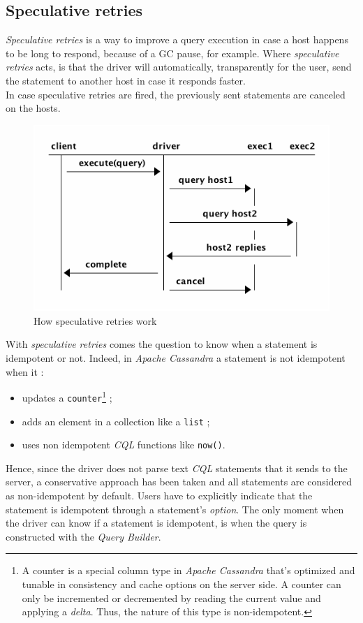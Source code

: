 \documentclass[a4paper]{report}
\newcommand{\ca}{\emph{Apache Cassandra\xspace}}
\newcommand{\sr}{\emph{speculative retries\xspace}}
\begin{document}
\subsection{Speculative retries}
\emph{Speculative retries} is a way to improve a query execution in case a host happens to be long to respond, because of a GC pause, for example. Where \sr{} acts, is that the driver will automatically, transparently for the user, send the statement to another host in case it responds faster.\\
In case speculative retries are fired, the previously sent statements are canceled on the hosts.\\
\begin{figure}[ht!]
\centering
\includegraphics[scale=0.7]{spec_rec.png}
\caption{How speculative retries work}
\end{figure}
With \sr{} comes the question to know when a statement is idempotent or not. Indeed, in \ca{} a statement is not idempotent when it : 
\begin{itemize}
   \item updates a \verb;counter;\footnote{A counter is a special column type in \ca{} that's optimized and tunable in consistency and cache options on the server side. A counter can only be incremented or decremented by reading the current value and applying a \emph{delta}. Thus, the nature of this type is non-idempotent.} ;
   \item adds an element in a collection like a \verb;list; ;
   \item uses non idempotent \emph{CQL} functions like \verb;now();.
\end{itemize}
Hence, since the driver does not parse text \emph{CQL} statements that it sends to the server, a conservative approach has been taken and all statements are considered as non-idempotent by default. Users have to explicitly indicate that the statement is idempotent through a statement's \emph{option}. The only moment when the driver can know if a statement is idempotent, is when the query is constructed with the \emph{Query Builder}.\\
\end{document}
